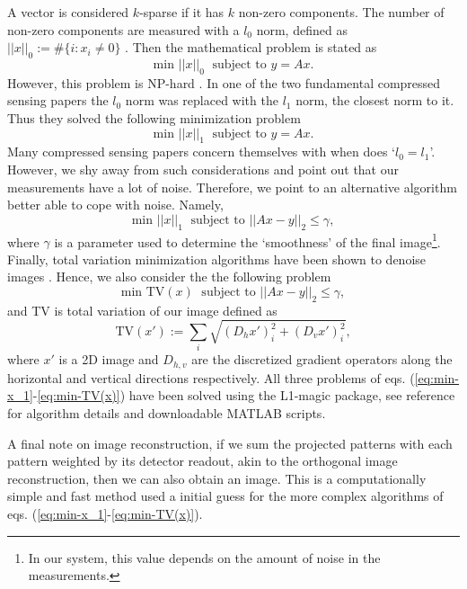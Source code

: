 A vector is considered $k$-sparse if it has $k$ non-zero components. The number of non-zero components are measured with a $l_0$ norm, defined as $||x||_0 := \# \{ i:x_i \neq 0 \} $ \cite{CC_theory}. Then the mathematical problem is stated as 
\begin{equation}
\text{min }||x||_0 \;\text{  subject to  } y=Ax.
\label{eq:min-x_0}
\end{equation}
However, this problem is NP-hard \cite{CC_NPhard}. In one of the two fundamental compressed sensing papers \cite{CC_L1norm} the $l_0$ norm was replaced with the $l_1$ norm, the closest norm to it. Thus they solved the following minimization problem
\begin{equation}
\text{min }||x||_1 \;\text{  subject to  } y=Ax.
\label{eq:min-x_1}
\end{equation}
Many compressed sensing papers concern themselves with when does `$l_0=l_1$'. However, we shy away from such considerations and point out that our measurements have a lot of noise. Therefore, we point to an alternative algorithm better able to cope with noise. Namely, 
\begin{equation}
\text{min }||x||_1 \;\text{  subject to  } ||Ax-y||_2\leq\gamma,
\label{eq:min-x_1 gamma}
\end{equation}
where $\gamma$ is a parameter used to determine the `smoothness' of the final image\footnote{In our system, this value depends on the amount of noise in the measurements.}. Finally, total variation minimization algorithms have been shown to denoise images \cite{image_TVmin}. Hence, we also consider the the following problem
\begin{equation}
\text{min TV}(x) \; \text{  subject to  } ||Ax-y||_2\leq\gamma,
\label{eq:min-TV(x)}
\end{equation}
and TV is total variation of our image defined as
\begin{equation}
\text{TV}(x') := \sum_i \sqrt{ (D_h x')_i^2 + (D_v x')_i^2},
\label{eq:TVdef}
\end{equation}
where $x'$ is a 2D image and $D_{h,v}$ are the discretized gradient operators along the horizontal and vertical directions respectively. All three problems of eqs. (\ref{eq:min-x_1}-\ref{eq:min-TV(x)}) have been solved using the L1-magic package, see reference \cite{L1-magic} for algorithm details and downloadable MATLAB scripts. 

A final note on image reconstruction, if we sum the projected patterns with each pattern weighted by its detector readout, akin to the orthogonal image reconstruction, then we can also obtain an image. This is a computationally simple and fast method used a initial guess for the more complex algorithms of eqs. (\ref{eq:min-x_1}-\ref{eq:min-TV(x)}). 

